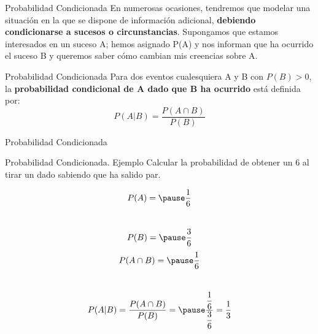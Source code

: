 \documentclass[11pt]{beamer}
\begin{document}
        \begin{frame}{Probabilidad Condicionada}
          En numerosas ocasiones, tendremos que modelar una situación en la que se dispone de información adicional, \textbf{debiendo condicionarse a sucesos o circunstancias}. Supongamos que estamos interesados en un suceso A; hemos asignado P(A) y nos informan que ha ocurrido el suceso B y queremos saber cómo cambian mis creencias sobre A.
          \pause
          \begin{block}{Probabilidad Condicionada}
            Para dos eventos cualesquiera A y B con $P(B) >  0$, la \textbf{probabilidad condicional de A dado que B ha ocurrido} está definida por:
            $$ P(A|B)=\dfrac{P(A\cap B)}{P(B)}$$
          \end{block}

        \end{frame}

        \begin{frame}{Probabilidad Condicionada}

            \begin{block}{Probabilidad Condicionada. Ejemplo}
                Calcular la probabilidad de obtener un 6 al tirar un dado sabiendo que ha salido par.
             \end{block}
            \pause
            \begin{block}{}
                $$P(A)= \pause \dfrac{1}{6} $$\\

                $$P(B)= \pause \dfrac{3}{6}$$
                $$P(A\cap B) = \pause \dfrac{1}{6}$$\\

                $$ P(A|B)=\dfrac{P(A\cap B)}{P(B)} = \pause \dfrac{\dfrac{1}{6}}{\dfrac{3}{6}}=\dfrac{1}{3}$$
            \end{block}
        \end{frame}
\end{document}
